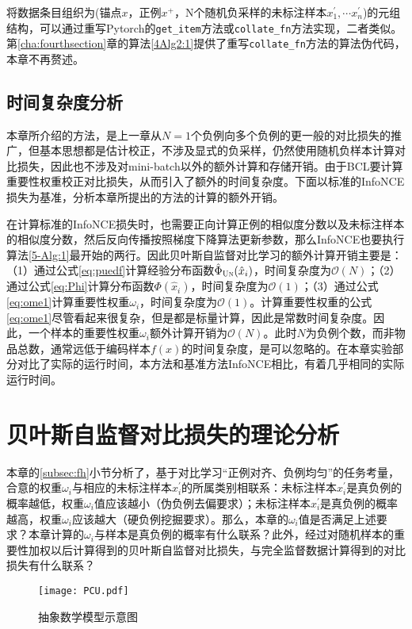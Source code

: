 将数据条目组织为(锚点$x$，正例$x^+$，N个随机负采样的未标注样本$x_1^\prime, \cdots x_n^\prime$)的元组结构，可以通过重写Pytorch的\verb|get_item|方法或\verb|collate_fn|方法实现，二者类似。第\ref{cha:fourthsection}章的算法\ref{4Alg2:1}提供了重写\verb|collate_fn|方法的算法伪代码，本章不再赘述。

\subsection{时间复杂度分析}
本章所介绍的方法，是上一章从$N=1$个负例向多个负例的更一般的对比损失的推广，但基本思想都是估计校正，不涉及显式的负采样，仍然使用随机负样本计算对比损失，因此也不涉及对mini-batch以外的额外计算和存储开销。由于BCL要计算重要性权重校正对比损失，从而引入了额外的时间复杂度。下面以标准的InfoNCE损失为基准，分析本章所提出的方法的计算的额外开销。

在计算标准的InfoNCE损失时，也需要正向计算正例的相似度分数以及未标注样本的相似度分数，然后反向传播按照梯度下降算法更新参数，那么InfoNCE也要执行算法\ref{5-Alg:1}最开始的两行。因此贝叶斯自监督对比学习的额外计算开销主要是：（1）通过公式\eqref{eq:puedf}计算经验分布函数$\hat \Phi_{\textsc{Un}} (\hat{x}_i)$，时间复杂度为$\mathcal{O}(N)$；（2）通过公式\eqref{eq:Phi}计算分布函数$\Phi(\hat{x}_i)$，时间复杂度为$\mathcal{O}(1)$；（3）通过公式\eqref{eq:ome1}计算重要性权重$\omega_i$，时间复杂度为$\mathcal{O}(1)$。计算重要性权重的公式\eqref{eq:ome1}尽管看起来很复杂，但是都是标量计算，因此是常数时间复杂度。因此，一个样本的重要性权重$\omega_i$额外计算开销为$\mathcal{O}(N)$。此时$N$为负例个数，而非物品总数，通常远低于编码样本$f(x)$的时间复杂度，是可以忽略的。在本章实验部分对比了实际的运行时间，本方法和基准方法InfoNCE相比，有着几乎相同的实际运行时间。

\section{贝叶斯自监督对比损失的理论分析}
本章的\ref{subsec:fh}小节分析了，基于对比学习“正例对齐、负例均匀”的任务考量，合意的权重$\omega_i$与相应的未标注样本$x^\prime_i$的所属类别相联系：未标注样本$x^\prime_i$是真负例的概率越低，权重$\omega_i$值应该越小（伪负例去偏要求）；未标注样本$x^\prime_i$是真负例的概率越高，权重$\omega_i$应该越大（硬负例挖掘要求）。那么，本章的$\omega_i$值是否满足上述要求？本章计算的$\omega_i$与样本是真负例的概率有什么联系？此外，经过对随机样本的重要性加权以后计算得到的贝叶斯自监督对比损失，与完全监督数据计算得到的对比损失有什么联系？
\begin{figure}[!]
	\centering
	\texttt{[image: PCU.pdf]}
	\caption{抽象数学模型示意图}
	\label{Fig:formulation}
\end{figure}
